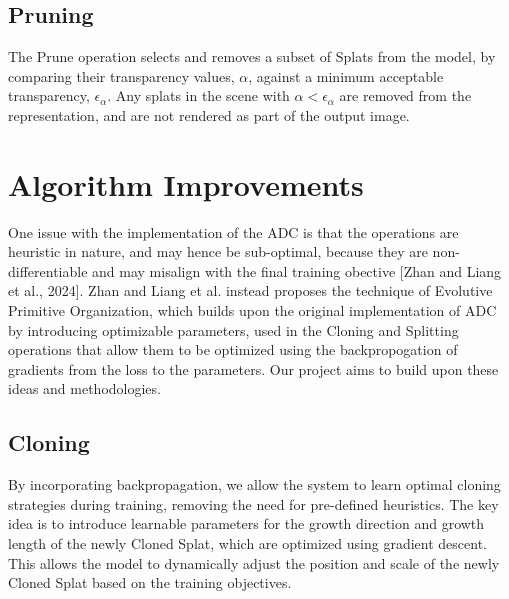 \documentclass[11pt]{report}
\begin{document}
\subsection{Pruning}
The Prune operation selects and removes a subset of Splats from the model, by comparing their transparency values, $\alpha$, against a minimum acceptable transparency, $\epsilon_{\alpha}$. Any splats in the scene with $\alpha < \epsilon_{\alpha}$ are removed from the representation, and are not rendered as part of the output image.


\section{Algorithm Improvements}
One issue with the implementation of the ADC is that the operations are heuristic in nature, and may hence be sub-optimal, because they are non-differentiable and may misalign with the final training obective [Zhan and Liang et al., 2024]. Zhan and Liang et al. instead proposes the technique of Evolutive Primitive Organization, which builds upon the original implementation of ADC by introducing optimizable parameters, used in the Cloning and Splitting operations that allow them to be optimized using the backpropogation of gradients from the loss to the parameters. Our project aims to build upon these ideas and methodologies.

\subsection{Cloning}

By incorporating backpropagation, we allow the system to learn optimal cloning strategies during training, removing the need for pre-defined heuristics. The key idea is to introduce learnable parameters for the growth direction and growth length of the newly Cloned Splat, which are optimized using gradient descent. This allows the model to dynamically adjust the position and scale of the newly Cloned Splat based on the training objectives.
\end{document}
